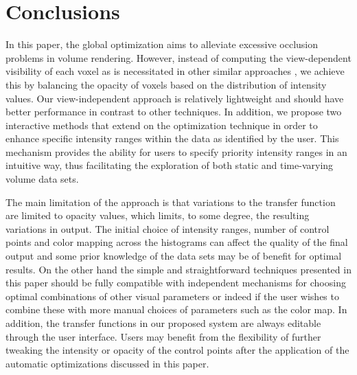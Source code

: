 \section{Conclusions}

In this paper, the global optimization aims to alleviate excessive occlusion problems in volume rendering. However, instead of computing the view-dependent visibility of each voxel as is necessitated in other similar approaches \cite{correa_visibility_2011} \cite{ruiz_automatic_2011}, we achieve this by balancing the opacity of voxels based on the distribution of intensity values. Our view-independent approach is relatively lightweight and should have better performance in contrast to other techniques.
In addition, we propose two interactive methods that extend on the optimization technique in order to enhance specific intensity ranges within the data as identified by the user.
This mechanism provides the ability for users to specify priority intensity ranges in an intuitive way, thus facilitating the exploration of both static and time-varying volume data sets.

The main limitation of the approach is that variations to the transfer function are limited to opacity values, which limits, to some degree, the resulting variations in output. The initial choice of intensity ranges, number of control points and color mapping across the histograms can affect the quality of the final output and some prior knowledge of the data sets may be of benefit for optimal results. On the other hand the simple and straightforward techniques presented in this paper should be fully compatible with independent mechanisms for choosing optimal combinations of other visual parameters or indeed if the user wishes to combine these with more manual choices of parameters such as the color map.
In addition, the transfer functions in our proposed system are always editable through the user interface. Users may benefit from the flexibility of further tweaking the intensity or opacity of the control points after the application of the automatic optimizations discussed in this paper.